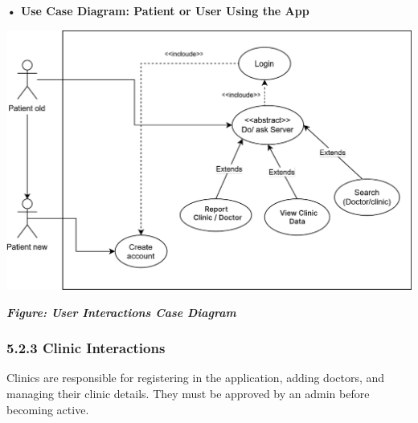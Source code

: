 \documentclass[12pt]{report}
\begin{document}
\vspace{0.5cm}
\noindent \textbf{• Use Case Diagram: Patient or User Using the App}
\vspace{0.6cm}
\begin{center}
	\includegraphics[width=\textwidth]{images/patientCAS.pdf} %
\end{center}
\vspace{-0.35cm}
\begin{center}
	\textit{\textbf{Figure: User Interactions Case Diagram}}
\end{center}
\newpage
\subsubsection*{\textbf{5.2.3 Clinic Interactions}}
Clinics are responsible for registering in the application, adding doctors, and managing their clinic details. They must be approved by an admin before becoming active.
\end{document}
